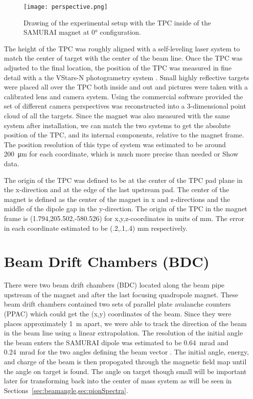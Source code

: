 \begin{figure}
\texttt{[image: perspective.png]}
\caption{Drawing of the experimental setup with the TPC inside of the SAMURAI magnet at $\ang{0}$ configuration.}
\label{fig:experiment}
\end{figure}

The height of the TPC was roughly aligned with a self-leveling laser system to match the center of target with the center of the beam line. Once the TPC was adjusted to the final location, the position of the TPC was measured in fine detail with a the VStars-N photogrametry system \cite{vstars}. Small highly reflective targets were placed all over the TPC both inside and out and pictures were taken with a calibrated lens and camera system. Using the commercial software provided the set of different camera perspectives was reconstructed into a 3-dimensional point cloud of all the targets. Since the magnet was also measured with the same system after installation, we can match the two systems to get the absolute position of the TPC, and its internal components, relative to the magnet frame. The position resolution of this type of system was estimated to be around \SI{200}{\micro\metre} for each coordinate, which is much more precise than needed or Show data.

The origin of the \spirit TPC was defined to be at the center of the TPC pad plane in the x-direction and at the edge of the last upstream pad. The center of the magnet is defined as the center of the magnet in x and z-directions and the middle of the dipole gap in the y-direction. The origin of the \spirit TPC in the magnet frame is (1.794,205.502,-580.526) for x,y,z-coordinates in units of \si{\milli\metre}. The error in each coordinate estimated to be (.2,.1,.4) \si{\milli\metre} respectively. 


\section{Beam Drift Chambers (BDC)}
\label{sec:bdc}

There were two beam drift chambers (BDC) located along the beam pipe upstream of the magnet and after the last focusing quadropole magnet. These beam drift chambers contained two sets of parallel plate avalanche counters (PPAC) which could get the (x,y) coordinates of the beam. Since they were places approximately \SI{1}{\metre} apart, we were able to track the direction of the beam in the beam line using a linear extrapolation. The resolution of the initial angle the beam enters the SAMURAI dipole was estimated to be \SI{0.64}{\milli\radian} and \SI{0.24}{\milli\radian} for the two angles defining the beam vector \cite{jon}. The initial angle, energy, and charge of the beam is then propogated through the magnetic field map until the angle on target is found. The angle on target though small will be important later for transforming back into the center of mass system as will be seen in Sections~\ref{sec:beamangle,sec:pionSpectra}.


